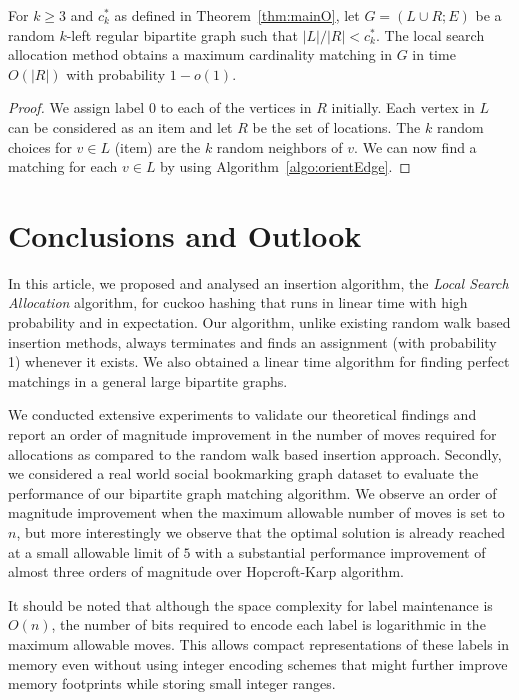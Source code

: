 \begin{corollary}
For $k\ge 3$ and $c^*_{k}$ as defined in Theorem~\ref{thm:mainO}, let $G=(L\cup R;E)$ be a random $k$-left regular bipartite graph such that ${|L| / |R| }<c^*_{k}$.  The local search allocation method obtains a maximum cardinality matching in $G$ in time $O(|R|)$ with probability $1-o(1)$.
\end{corollary}
\begin{proof}
We assign label $0$ to each of the vertices in $R$ initially. Each vertex in $L$ can be considered as an item and let $R$ be the set of locations. The $k$ random choices for $v\in L$ (item) are the $k$ random neighbors of $v$. We can now find a matching for each $v\in L$ by using Algorithm~\ref{algo:orientEdge}.
\end{proof}



\section{Conclusions and Outlook}
\label{chap:conc}

In this article, we proposed and analysed an insertion algorithm, the \emph{Local Search Allocation} algorithm, for cuckoo hashing that runs in linear time with high probability and in expectation. Our algorithm, unlike existing random walk based insertion methods, always terminates and finds an assignment (with probability 1) whenever it exists. We also obtained a linear time algorithm for finding perfect matchings in a general large bipartite graphs.

We conducted extensive experiments to validate our theoretical findings and report an order of magnitude improvement in the number of moves required for allocations as compared to the random walk based insertion approach. Secondly, we considered a real world social bookmarking graph dataset to evaluate the performance of our bipartite graph matching algorithm. We observe an order of magnitude improvement when the maximum allowable number of moves is set to $n$, but more interestingly we observe that the optimal solution is already reached at a small allowable limit of $5$ with a substantial performance improvement of almost three orders of magnitude over Hopcroft-Karp algorithm.

It should be noted that although the space complexity for label maintenance is $O(n)$, the number of bits required to encode each label is logarithmic in the maximum allowable moves. This allows compact representations of these labels in memory even without using integer encoding schemes that might further improve memory footprints while storing small integer ranges.

